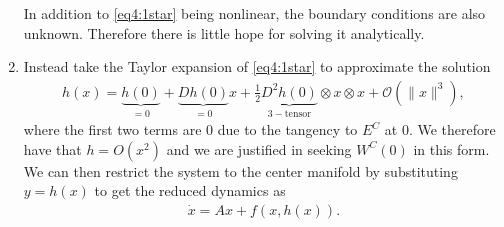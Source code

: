 \begin{enumerate}
In addition to \eqref{eq4:1star} being nonlinear, the boundary conditions are also  unknown. Therefore there is little hope for solving it analytically.
\item Instead take the Taylor expansion of \eqref{eq4:1star} to approximate the solution
	\begin{align}
		h(x) = \underbrace{h(0)}_{=0} + \underbrace{Dh(0)}_{=0}x + \frac{1}{2} \underbrace{D^2h(0)}_{3- \textrm{tensor} } \otimes x \otimes x + \mathcal{O}(\|x \| ^3),
	\end{align}
	where the first two terms are 0 due to the tangency to $E^{C}$ at $0$. We therefore have that $h = O(x^2)$ and we are justified in seeking $W^C(0)$ in this form. We can then restrict the system to the center manifold by substituting $y = h(x)$ to get the reduced dynamics as 
	\begin{align}
		\boxed{
			\dot{x}=Ax+f(x,h(x)).
		}
	\end{align}
\end{enumerate}

